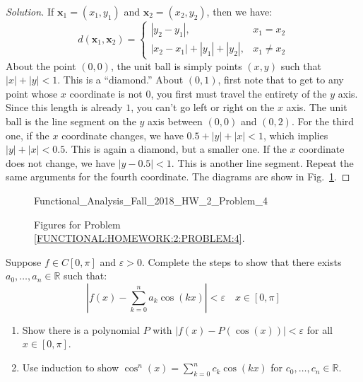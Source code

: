 \documentclass[crop=false,class=article,oneside]{standalone}
\begin{document}
        \begin{proof}[Solution]
            If $\mathbf{x}_{1}=(x_{1},y_{1})$ and
            $\mathbf{x}_{2}=(x_{2},y_{2})$, then we have:
            \begin{equation*}
                d(\mathbf{x}_{1},\mathbf{x}_{2})=
                \begin{cases}
                    |y_{2}-y_{1}|,&x_{1}=x_{2}\\
                    |x_{2}-x_{1}|+|y_{1}|+|y_{2}|,&x_{1}\ne{x_{2}}
                \end{cases}
            \end{equation*}
            About the point $(0,0)$, the unit ball is simply points
            $(x,y)$ such that $|x|+|y|<1$. This is a ``diamond.''
            About $(0,1)$, first note that to get to any point
            whose $x$ coordinate is not $0$, you first must travel
            the entirety of the $y$ axis. Since this length is
            already $1$, you can't go left or right on the $x$ axis.
            The unit ball is the line segment on the $y$ axis
            between $(0,0)$ and $(0,2)$. For the third one, if
            the $x$ coordinate changes, we have
            $0.5+|y|+|x|<1$, which implies
            $|y|+|x|<0.5$. This is again a diamond, but a
            smaller one. If the $x$ coordinate does not
            change, we have $|y-0.5|<1$. This is another
            line segment. Repeat the same arguments for the
            fourth coordinate. The diagrams are show in
            Fig.~\ref{FUNCTIONAL:HOMEWORK:2:PROBLEM:4:FIGURES}.
        \end{proof}
        \begin{figure}[H]
            \centering
            \captionsetup{type=figure}
            
                      {Functional_Analysis_Fall_2018_HW_2_Problem_4}
            \caption[Figures for Wangsness 1-11 and 1-12]{%
                Figures for Problem
                \ref{FUNCTIONAL:HOMEWORK:2:PROBLEM:4}.%
            }
            \label{FUNCTIONAL:HOMEWORK:2:PROBLEM:4:FIGURES}
        \end{figure}
        \begin{problem}
            Suppose $f\in{C[0,\pi]}$ and $\varepsilon>0$.
            Complete the steps to show that there exists
            $a_{0},\hdots,a_{n}\in\mathbb{R}$ such that:
            \begin{equation*}
                |f(x)-\sum_{k=0}^{n}a_{k}\cos(kx)|<\varepsilon\quad{x\in[0,\pi]}
            \end{equation*}
            \begin{enumerate}
                \item Show there is a polynomial $P$ with
                      $|f(x)-P(\cos(x))|<\varepsilon$
                      for all $x\in[0,\pi]$.
                \item Use induction to show
                      $\cos^{n}(x)=\sum_{k=0}^{n}c_{k}\cos(kx)$
                      for $c_{0},\hdots,c_{n}\in\mathbb{R}$.
            \end{enumerate}
        \end{problem}
\end{document}
